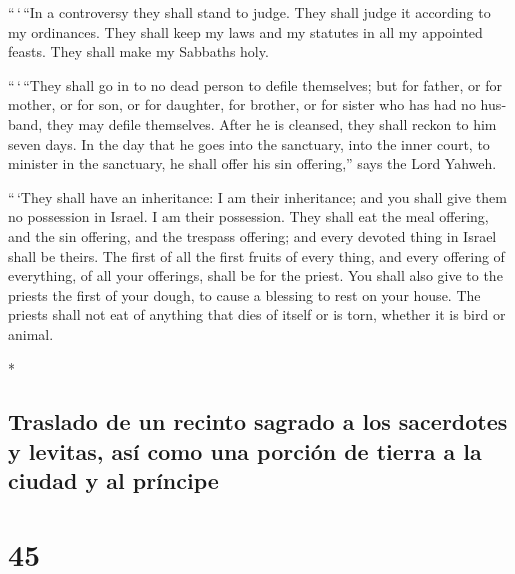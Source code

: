 \begin{paracol}{2}
\begin{otherlanguage}{english}
 ``\,`\,``In a controversy they shall stand to judge.
They shall judge it according to my ordinances. They shall keep my laws
and my statutes in all my appointed feasts. They shall make my Sabbaths
holy.

 ``\,`\,``They shall go in to no dead person to defile
themselves; but for father, or for mother, or for son, or for daughter,
for brother, or for sister who has had no husband, they may defile
themselves.  After he is cleansed, they shall reckon to
him seven days.  In the day that he goes into the
sanctuary, into the inner court, to minister in the sanctuary, he shall
offer his sin offering,'' says the Lord Yahweh.

 ``\,`They shall have an inheritance: I am their
inheritance; and you shall give them no possession in Israel. I am their
possession.  They shall eat the meal offering, and the
sin offering, and the trespass offering; and every devoted thing in
Israel shall be theirs.  The first of all the first
fruits of every thing, and every offering of everything, of all your
offerings, shall be for the priest. You shall also give to the priests
the first of your dough, to cause a blessing to rest on your house.
 The priests shall not eat of anything that dies of
itself or is torn, whether it is bird or animal.

\end{otherlanguage}

\switchcolumn[0]*

\hypertarget{traslado-de-un-recinto-sagrado-a-los-sacerdotes-y-levitas-asuxed-como-una-porciuxf3n-de-tierra-a-la-ciudad-y-al-pruxedncipe}{%
\subsection{Traslado de un recinto sagrado a los sacerdotes y levitas,
así como una porción de tierra a la ciudad y al
príncipe}\label{traslado-de-un-recinto-sagrado-a-los-sacerdotes-y-levitas-asuxed-como-una-porciuxf3n-de-tierra-a-la-ciudad-y-al-pruxedncipe}}

\hypertarget{section-88}{%
\section{45}\label{section-88}}


\end{paracol}
